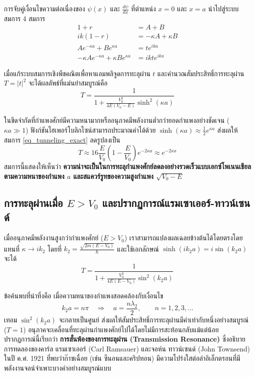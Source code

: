 การจับคู่เงื่อนไขความต่อเนื่องของ $\psi(x)$ และ $\frac{d\psi}{dx}$ ที่ตำแหน่ง $x = 0$ และ $x = a$ นำไปสู่ระบบสมการ 4 สมการ
\begin{align}
1 + r &= A + B \\
ik(1 - r) &= -\kappa A + \kappa B \\
A e^{-\kappa a} + B e^{\kappa a} &= t e^{ik a} \\
-\kappa A e^{-\kappa a} + \kappa B e^{\kappa a} &= ik t e^{ik a}
\end{align}

เมื่อแก้ระบบสมการเชิงพีชคณิตเพื่อหาแอมพลิจูดการทะลุผ่าน $t$ และคำนวณสัมประสิทธิ์การทะลุผ่าน $T = |t|^2$ จะได้ผลลัพธ์ที่แม่นยำสมบูรณ์คือ
\begin{equation}
T = \frac{1}{1 + \frac{V_0^2}{4E(V_0 - E)} \sinh^2(\kappa a)} \label{eq_tunneling_exact}
\end{equation}

ในขีดจำกัดที่กำแพงศักย์มีความหนามากหรืออนุภาคมีพลังงานต่ำกว่ายอดกำแพงอย่างชัดเจน ($\kappa a \gg 1$) ฟังก์ชันไฮเพอร์โบลิกไซน์สามารถประมาณค่าได้ด้วย $\sinh(\kappa a) \approx \frac{1}{2}e^{\kappa a}$ ส่งผลให้สมการ \eqref{eq_tunneling_exact} ลดรูปลงเป็น
\begin{equation}
T \approx 16 \frac{E}{V_0}\left(1 - \frac{E}{V_0}\right) e^{-2\kappa a} \approx e^{-2\kappa a}
\end{equation}
สมการนี้แสดงให้เห็นว่า \textbf{ความน่าจะเป็นในการทะลุกำแพงศักย์ลดลงอย่างรวดเร็วแบบเอกซ์โพเนนเชียลตามความหนาของกำแพง $a$ และสแควร์รูทของความสูงกำแพง $\sqrt{V_0 - E}$}

\subsection{การทะลุผ่านเมื่อ $E > V_0$ และปรากฏการณ์แรมเซาเออร์-ทาวน์เซนด์}
เมื่ออนุภาคมีพลังงานสูงกว่ากำแพงศักย์ ($E > V_0$) เราสามารถแปลงผลเฉลยข้างต้นได้โดยตรงโดยแทนที่ $\kappa \to i k_2$ โดยที่ $k_2 = \frac{\sqrt{2m(E - V_0)}}{\hbar}$ และใช้เอกลักษณ์ $\sinh(i k_2 a) = i \sin(k_2 a)$ จะได้
\begin{equation}
T = \frac{1}{1 + \frac{V_0^2}{4E(E - V_0)} \sin^2(k_2 a)}
\end{equation}

ข้อค้นพบที่น่าทึ่งคือ เมื่อความหนาของกำแพงสอดคล้องกับเงื่อนไข
\begin{equation}
k_2 a = n\pi \quad \Longrightarrow \quad a = \frac{n\lambda_2}{2}, \qquad n = 1, 2, 3, \dots
\end{equation}
เทอม $\sin^2(k_2 a)$ จะกลายเป็นศูนย์ ส่งผลให้สัมประสิทธิ์การทะลุผ่านมีค่าเท่ากับหนึ่งอย่างสมบูรณ์ ($T = 1$) อนุภาคจะเคลื่อนที่ทะลุผ่านกำแพงศักย์ไปได้โดยไม่มีการสะท้อนกลับแม้แต่น้อย ปรากฏการณ์นี้เรียกว่า \textbf{การสั่นพ้องของการทะลุผ่าน (Transmission Resonance)} ซึ่งอธิบายการทดลองของคาร์ล แรมเซาเออร์ (Carl Ramsauer) และจอห์น ทาวน์เซนด์ (John Townsend) ในปี ค.ศ. 1921 ที่พบว่าก๊าซเฉื่อย (เช่น ซีนอนและคริปทอน) มีความโปร่งใสต่อลำอิเล็กตรอนที่มีพลังงานจลน์จำเพาะบางค่าอย่างสมบูรณ์แบบ


